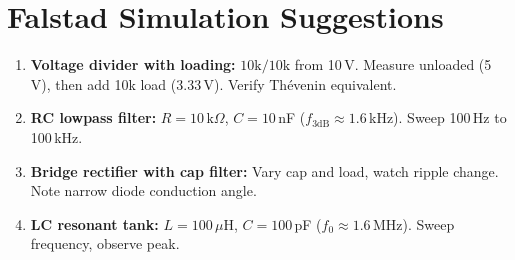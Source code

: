 \documentclass[11pt,a4paper]{article}
\begin{document}
\section{Falstad Simulation Suggestions}

\begin{enumerate}[nosep]
\item \textbf{Voltage divider with loading:} $10\text{k}/10\text{k}$ from 10\,V. Measure unloaded (5\,V), then add 10k load (3.33\,V). Verify Th\'{e}venin equivalent.
\item \textbf{RC lowpass filter:} $R = 10\,\text{k}\Omega$, $C = 10\,$nF ($f_{3\text{dB}} \approx 1.6\,$kHz). Sweep 100\,Hz to 100\,kHz.
\item \textbf{Bridge rectifier with cap filter:} Vary cap and load, watch ripple change. Note narrow diode conduction angle.
\item \textbf{LC resonant tank:} $L = 100\,\mu$H, $C = 100\,$pF ($f_0 \approx 1.6\,$MHz). Sweep frequency, observe peak.
\end{enumerate}
\end{document}
